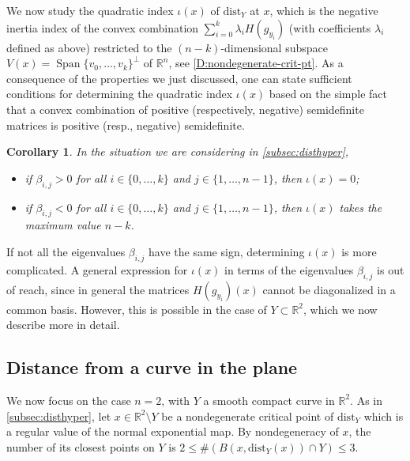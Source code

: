 \documentclass{amsart}
\newcommand{\R}{\mathbb{R}}
\newcommand{\dd}{\mathrm{dist}}
\def\quadi{\iota}
\newtheorem{corollary}[subsubsection]{Corollary}
\theoremstyle{definition}
\theoremstyle{remark}
\begin{document}
We now study the quadratic index $\quadi(x)$ of $\dd_Y$ at $x$, which is the negative inertia index of the convex combination $\sum_{i=0}^k \lambda_i H(g_{y_i})$ (with coefficients $\lambda_i$ defined as above) restricted to the $(n-k)$-dimensional subspace $V(x)= \operatorname{Span}\{v_0,\ldots ,v_k\}^{\perp}$ of $\R^n$, see \cref{D:nondegenerate-crit-pt}. 
As a consequence of the properties we just discussed, one can state sufficient conditions for determining the quadratic index $\quadi (x)$ based on the simple fact that a convex combination of positive (respectively, negative) semidefinite matrices is positive (resp., negative) semidefinite. 
\begin{corollary}\label{coro:quadi}
In the situation we are considering in \cref{subsec:disthyper}, 
\begin{itemize}
\item [-] if $\beta_{i,j}>0$ for all $i\in \{0,\ldots ,k\}$ and $j\in \{1,\ldots ,n-1\}$, then $\quadi(x)=0$; 
\item [-] if $\beta_{i,j}<0$ for all $i\in \{0,\ldots ,k\}$ and $j\in \{1,\ldots ,n-1\}$, then $\quadi(x)$ takes the maximum value $n-k$.
\end{itemize}
\end{corollary}
If not all the eigenvalues $\beta_{i,j}$ have the same sign, determining $\quadi (x)$ is more complicated. A general expression for $\quadi (x)$ in terms of the eigenvalues $\beta_{i,j}$ is out of reach, since in general the matrices $H(g_{y_i})(x)$ cannot be diagonalized in a common basis. However, this is possible in the case of $Y\subset \R^2$, which we now describe more in detail. 

\subsection{Distance from a curve in the plane}
We now focus on the case $n=2$, with $Y$ a smooth compact curve in $\mathbb{R}^2$.
As in \cref{subsec:disthyper}, let $x \in \mathbb{R}^2 \setminus Y$ be a nondegenerate critical point of $\dd_Y$ which is a regular value of the normal exponential map. By nondegeneracy of $x$, the number of its closest points on $Y$ is $2\le \# (B(x,\dd_Y(x))\cap Y) \le 3$.
\end{document}
